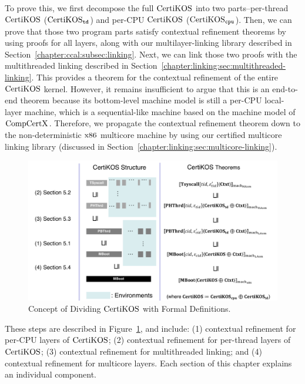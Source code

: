 To  prove this, we first decompose the full $\mathrm{CertiKOS}$ into two parts--per-thread $\mathrm{CertiKOS}$ ($\mathrm{CertiKOS}_{{\mathrm{\texttt{td}}}}$) and per-CPU $\mathrm{CertiKOS}$ ($\mathrm{CertiKOS}_{{\mathrm{\texttt{cpu}}}}$).
Then, we can prove that those two program parts satisfy contextual refinement theorems by using proofs for all layers,
along with our multilayer-linking library described in Section~\ref{chapter:ccal:subsec:linking}. 
Next, we can link those two proofs with the multithreaded linking described in Section~\ref{chapter:linking:sec:multithreaded-linking}. 
This provides a theorem for the contextual refinement of the entire $\mathrm{CertiKOS}$ kernel. 
However, it remains insufficient to argue that this is an end-to-end theorem because its bottom-level machine model is still a per-CPU local-layer machine, which is a sequential-like machine based on the machine model of $\mathrm{CompCertX}$. 
Therefore, we propagate the contextual refinement theorem down to the non-deterministic $\mathrm{x86}$ multicore machine by using our certified multicore linking library (discussed in Section~\ref{chapter:linking:sec:multicore-linking}).
\begin{figure}
\includegraphics[width=\textwidth, page=1]{figs/certikos/concurrent_linking}
\caption{Concept of Dividing $\mathrm{CertiKOS}$ with Formal Definitions.} 
\label{fig:chapter:certikos:idea-of-dividing-certikos-with-formal-def}
\end{figure}
These steps are described in Figure~\ref{fig:chapter:certikos:idea-of-dividing-certikos-with-formal-def}, and include: 
(1) contextual refinement for per-CPU layers of $\mathrm{CertiKOS}$; 
(2) contextual refinement for per-thread layers of $\mathrm{CertiKOS}$; 
(3) contextual refinement for multithreaded linking; and 
(4) contextual refinement for multicore layers. Each section of this chapter explains an individual component.
